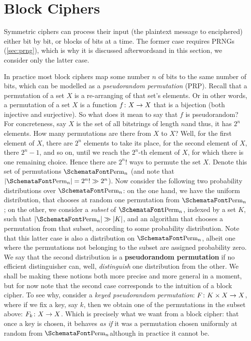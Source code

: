 \section{Block Ciphers}
  \label{sec:block_ciphers}
  Symmetric ciphers can process their input (the plaintext message to enciphered) either bit by bit, or blocks of bits at a time. The former case requires PRNGs (\ts\ref{sec:prng}), which is why it is discussed afterwords\emd and in this section, we consider only the latter case.

  In practice most block ciphers map some number $n$ of bits to the same number of bits, which can be modelled as a \emph{pseudorandom permutation} (PRP). Recall that a permutation of a set $X$ is a re-arranging of that set's elements. Or in other words, a permutation of a set $X$ is a function $f\colon X \rightarrow X$ that is a bijection (both injective and surjective). So what does it mean to say that $f$ is pseudorandom? For concreteness, say $X$ is the set of all bitstrings of length $n$\emd and thus, it has $2^n$ elements. How many permutations are there from $X$ to $X$? Well, for the first element of $X$, there are $2^n$ elements to take its place, for the second element of $X$, there $2^n-1$, and so on, until we reach the $2^n$-th element of $X$, for which there is one remaining choice. Hence there are $2^{n}!$ ways to permute the set $X$. Denote this set of permutations $\sgg{Perm}_n$ (and note that $\abs{\sgg{Perm}_n} = 2^n! \gg 2^n$). Now consider the following two probability distributions over $\sgg{Perm}_n$: on the one hand, we have the uniform distribution, that chooses at random one permutation from $\sgg{Perm}_n$; on the other, we consider a \emph{subset} of $\sgg{Perm}_n$, indexed by a set $K$, such that $\abs{\sgg{Perm}_n} \gg \abs{K}$, and an algorithm that chooses a permutation from that subset, according to some probability distribution. Note that this latter case is also a distribution on $\sgg{Perm}_n$, albeit one where the permutations not belonging to the subset are assigned probability zero. We say that the second distribution is a \textbf{pseudorandom permutation} if no efficient distinguisher can, well, \emph{distinguish} one distribution from the other.
  We shall be making these notions both more precise and more general in a moment, but for now note that the second case corresponds to the intuition of a block cipher. To see why, consider a \emph{keyed pseudorandom permutation}: $F\colon K\times X \rightarrow X$, where if we fix a key, say $k$, then we obtain one of the permutations in the subset above: $F_k\colon X \rightarrow X$. Which is precisely what we want from a block cipher: that once a key is chosen, it behaves \emph{as if} it was a permutation chosen uniformly at random from $\sgg{Perm}_n$\emd although in practice it cannot be.

